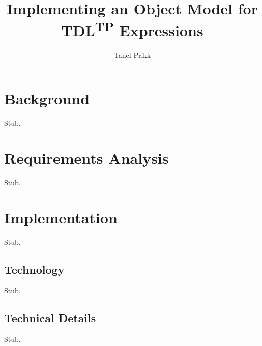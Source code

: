 \documentclass[12pt,oneside,a4paper,draft,notitlepage]{report}
\title{
	Implementing an Object Model for TDL\textsuperscript{TP} Expressions
}
\author{Tanel Prikk}
\begin{document}
	\maketitle

	\section*{Background}
	\par Stub.

	\section*{Requirements Analysis}
	\par Stub.

	\section*{Implementation}
	\par Stub.

	\subsection*{Technology}
	\par Stub.

	\subsection*{Technical Details}
	\par Stub.

	\printbibliography[
		title=Sources
	]
\end{document}
